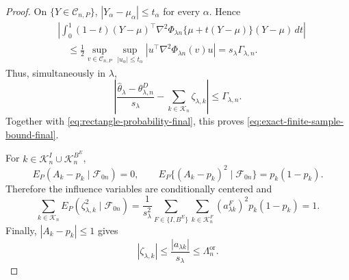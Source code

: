 \documentclass[11pt]{article}
\theoremstyle{definition}
\newcommand{\1}{\mathbf 1}\newcommand{\op}{\operatorname}
\begin{document}
\begin{proof}
On $\{Y\in\mathcal C_{n,P}\}$,
$|Y_\alpha-\mu_\alpha|\le t_\alpha$ for every $\alpha$. Hence
\begin{equation}
\begin{split}
&\left|
\int_0^1(1-t)
(Y-\mu)^\top
\nabla^2\Phi_{\lambda n}\{\mu+t(Y-\mu)\}
(Y-\mu)\,dt
\right|\\
&\quad\le
\frac12
\sup_{v\in\mathcal C_{n,P}}
\sup_{|u_\alpha|\le t_\alpha}
|u^\top\nabla^2\Phi_{\lambda n}(v)u|
=
s_\lambda\Gamma_{\lambda,n}.
\end{split}
\label{eq:remainder-bound-final}
\end{equation}
Thus, simultaneously in $\lambda$,
\[
\left|
\frac{\widehat\theta_\lambda-\theta_{\lambda,n}^D}{s_\lambda}
-
\sum_{k\in\mathcal K_n}\zeta_{\lambda,k}
\right|
\le\Gamma_{\lambda,n}.
\]
Together with \eqref{eq:rectangle-probability-final}, this proves
\eqref{eq:exact-finite-sample-bound-final}.

For $k\in\mathcal K_n^I\cup\mathcal K_n^{B^E}$,
\[
E_P(A_k-p_k\mid\mathcal F_{0n})=0,
\qquad
E_P\{(A_k-p_k)^2\mid\mathcal F_{0n}\}
=p_k(1-p_k).
\]
Therefore the influence variables are conditionally centered and
\[
\sum_{k\in\mathcal K_n}
E_P(\zeta_{\lambda,k}^2\mid\mathcal F_{0n})
=
\frac{1}{s_\lambda^2}
\sum_{F\in\{I,B^E\}}
\sum_{k\in\mathcal K_n^F}
(a_{\lambda k}^F)^2p_k(1-p_k)
=1.
\]
Finally, $|A_k-p_k|\le1$ gives
\[
|\zeta_{\lambda,k}|
\le
\frac{|a_{\lambda k}|}{s_\lambda}
\le\Lambda_n^{\mathrm{or}}.
\]
\end{proof}
\end{document}
